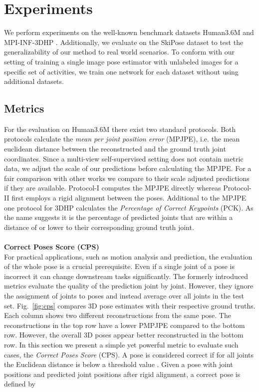 \documentclass[final]{cvpr}
\begin{document}
\section{Experiments}
We perform experiments on the well-known benchmark datasets Human3.6M \cite{h36m_pami} and MPI-INF-3DHP \cite{mpii3Dhp2017}.
Additionally, we evaluate on the SkiPose dataset \cite{sporri2016reasearch_skipose,rhodin2018learning} to test the generalizability of our method to real world scenarios.
To conform with our setting of training a single image pose estimator with unlabeled images for a specific set of activities, we train one network for each dataset without using additional datasets.


\subsection{Metrics}
For the evaluation on Human3.6M there exist two standard protocols.
Both protocols calculate the \textit{mean per joint position error} (MPJPE), i.e. the mean euclidean distance between the reconstructed and the ground truth joint coordinates.
Since a multi-view self-supervised setting does not contain metric data, we adjust the scale of our predictions before calculating the MPJPE.
For a fair comparison with other works we compare to their scale adjusted predictions if they are available.
Protocol-I computes the MPJPE directly whereas Protocol-II first employs a rigid alignment between the poses.
Additional to the MPJPE one protocol for 3DHP calculates the \textit{Percentage of Correct Keypoints} (PCK).
As the name suggests it is the percentage of predicted joints that are within a distance of  or lower to their corresponding ground truth joint.
\\\\
\textbf{Correct Poses Score (CPS)}
\\
For practical applications, such as motion analysis and prediction, the evaluation of the whole pose is a crucial prerequisite.
Even if a single joint of a pose is incorrect it can change downstream tasks significantly.
The formerly introduced metrics evaluate the quality of the prediction joint by joint.
However, they ignore the assignment of joints to poses and instead average over all joints in the test set.
Fig.~\ref{fig:cps} compares 3D pose estimates with their respective ground truths.
Each column shows two different reconstructions from the same pose.
The reconstructions in the top row have a lower PMPJPE compared to the bottom row.
However, the overall 3D poses appear better reconstructed in the bottom row.
In this section we present a simple yet powerful metric to evaluate such cases, the \textit{Correct Poses Score} (CPS).
A pose  is considered correct if for all joints  the Euclidean distance is below a threshold value .
Given a pose with joint positions  and predicted joint positions  after rigid alignment, a correct pose is defined by
\end{document}
